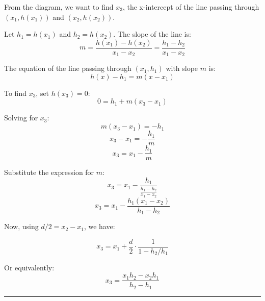 \vspace{0.5em}

From the diagram, we want to find $x_3$, the x-intercept of the line passing through $(x_1, h(x_1))$ and $(x_2, h(x_2))$.

Let $h_1 = h(x_1)$ and $h_2 = h(x_2)$. The slope of the line is:
\[
    m = \frac{h(x_1) - h(x_2)}{x_1 - x_2} = \frac{h_1 - h_2}{x_1 - x_2}
\]

The equation of the line passing through $(x_1, h_1)$ with slope $m$ is:
\[
    h(x) - h_1 = m(x - x_1)
\]

To find $x_3$, set $h(x_3) = 0$:
\[
    0 = h_1 + m(x_3 - x_1)
\]

Solving for $x_3$:
\[
    m(x_3 - x_1) = -h_1
\]
\[
    x_3 - x_1 = -\frac{h_1}{m}
\]
\[
    x_3 = x_1 - \frac{h_1}{m}
\]

Substitute the expression for $m$:
\[
    x_3 = x_1 - \frac{h_1}{\frac{h_1 - h_2}{x_1 - x_2}}
\]
\[
    x_3 = x_1 - \frac{h_1(x_1 - x_2)}{h_1 - h_2}
\]

Now, using $d/2 = x_2 - x_1$, we have:

\[
    \boxed{x_3 = x_1 + \frac{d}{2} \cdot \frac{1}{1 - h_2/h_1}}
\]

Or equivalently:
\[
    \boxed{x_3 = \frac{x_1 h_2 - x_2 h_1}{h_2 - h_1}}
\]

\vspace{2em}
\noindent\rule{\textwidth}{0.4pt}

